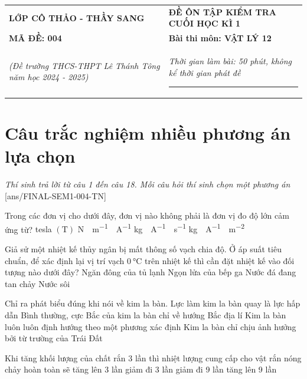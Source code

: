\begin{tabular}{M{7cm}M{10.5cm}}
	\textbf{LỚP CÔ THẢO - THẦY SANG}& \textbf{ĐỀ ÔN TẬP KIỂM TRA CUỐI HỌC KÌ 1}\\
	\textbf{MÃ ĐỀ: 004}& \textbf{Bài thi môn: VẬT LÝ 12}\\
	\textit{(Đề trường THCS-THPT Lê Thánh Tông năm học 2024 - 2025)}& \textit{Thời gian làm bài: 50 phút, không kể thời gian phát đề}
	
	\noindent\rule{4cm}{0.8pt} \\
\end{tabular}
\setcounter{section}{0}
\section{Câu trắc nghiệm nhiều phương án lựa chọn}
\textit{Thí sinh trả lời từ câu 1 đến câu 18. Mỗi câu hỏi thí sinh chọn một phương án}
\setcounter{ex}{0}
[ans/FINAL-SEM1-004-TN]
\begin{ex}
	Trong các đơn vị cho dưới đây, đơn vị nào không phải là đơn vị đo độ lớn cảm ứng từ?
	\choice
	{tesla $\left(\si{\tesla}\right)$}
	{\si{\newton\cdot\meter^{-1}\cdot\ampere^{-1}}}
	{\si{\kilogram\cdot\ampere^{-1}\cdot\second^{-1}}}
	{\True \si{\kilogram\cdot\ampere^{-1}\cdot\meter^{-2}}}
	\loigiai{}
\end{ex}
\begin{ex}
	Giả sử một nhiệt kế thủy ngân bị mất thông số vạch chia độ. Ở áp suất tiêu chuẩn, để xác định lại vị trí vạch $\SI{0}{\celsius}$ trên nhiệt kế thì cần đặt nhiệt kế vào đối tượng nào dưới đây?
	\choice
	{Ngăn đông của tủ lạnh}
	{Ngọn lửa của bếp ga}
	{\True Nước đá đang tan chảy}
	{Nước sôi}
	\loigiai{}
\end{ex}
\begin{ex}
	Chỉ ra phát biểu đúng khi nói về kim la bàn.
	\choice
	{Lực làm kim la bàn quay là lực hấp dẫn}
	{\True Bình thường, cực Bắc của kim la bàn chỉ về hướng Bắc địa lí}
	{Kim la bàn luôn luôn định hướng theo một phương xác định}
	{Kim la bàn chỉ chịu ảnh hưởng bởi từ trường của Trái Đất}
	\loigiai{}
\end{ex}
\begin{ex}
	Khi tăng khối lượng của chất rắn 3 lần thì nhiệt lượng cung cấp cho vật rắn nóng chảy hoàn toàn sẽ
	\choice
	{\True tăng lên 3 lần}
	{giảm đi 3 lần}
	{giảm đi 9 lần}
	{tăng lên 9 lần}
	\loigiai{}
\end{ex}
